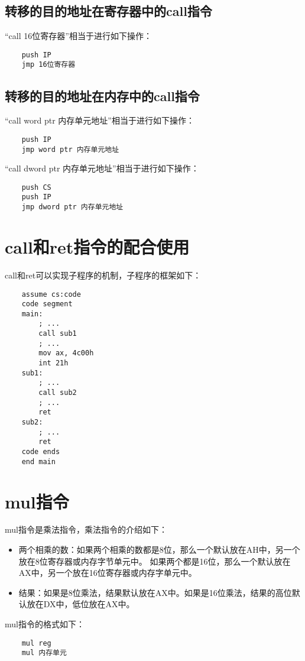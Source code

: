 \documentclass[a4paper,left=2.5cm,right=2.5cm,11pt]{article}
\begin{document}
\subsection{转移的目的地址在寄存器中的call指令}
	“call 16位寄存器”相当于进行如下操作：
	\begin{lstlisting}
	push IP
	jmp 16位寄存器
	\end{lstlisting}

\subsection{转移的目的地址在内存中的call指令}
	“call word ptr 内存单元地址”相当于进行如下操作：
	\begin{lstlisting}
	push IP
	jmp word ptr 内存单元地址
	\end{lstlisting}

	“call dword ptr 内存单元地址”相当于进行如下操作：
	\begin{lstlisting}
	push CS
	push IP
	jmp dword ptr 内存单元地址
	\end{lstlisting}

\section{call和ret指令的配合使用}
	call和ret可以实现子程序的机制，子程序的框架如下：
	\begin{lstlisting}
	assume cs:code
	code segment
	main:
		; ...
		call sub1
		; ...
		mov ax, 4c00h
		int 21h
	sub1:
		; ...
		call sub2
		; ...
		ret
	sub2:
		; ...
		ret
	code ends
	end main
	\end{lstlisting}

\section{mul指令}
	mul指令是乘法指令，乘法指令的介绍如下：
	\begin{itemize}
		\item 两个相乘的数：如果两个相乘的数都是8位，那么一个默认放在AH中，另一个放在8位寄存器或内存字节单元中。
			如果两个都是16位，那么一个默认放在AX中，另一个放在16位寄存器或内存字单元中。
		\item 结果：如果是8位乘法，结果默认放在AX中。如果是16位乘法，结果的高位默认放在DX中，低位放在AX中。
	\end{itemize}
	
	mul指令的格式如下：
	\begin{lstlisting}
	mul reg
	mul 内存单元
	\end{lstlisting}
\end{document}
